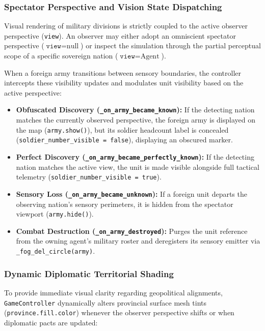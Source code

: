 \subsubsection{Spectator Perspective and Vision State Dispatching}
Visual rendering of military divisions is strictly coupled to the active observer perspective (\texttt{view}). An observer may either adopt an omniscient spectator perspective ($\texttt{view} = \text{null}$) or inspect the simulation through the partial perceptual scope of a specific sovereign nation ($\texttt{view} = \text{Agent}$).

When a foreign army transitions between sensory boundaries, the controller intercepts these visibility updates and modulates unit visibility based on the active perspective:
\begin{itemize}
    \item \textbf{Obfuscated Discovery (\texttt{\_on\_army\_became\_known}):} If the detecting nation matches the currently observed perspective, the foreign army is displayed on the map (\texttt{army.show()}), but its soldier headcount label is concealed (\texttt{soldier\_number\_visible = false}), displaying an obscured marker.
    \item \textbf{Perfect Discovery (\texttt{\_on\_army\_became\_perfectly\_known}):} If the detecting nation matches the active view, the unit is made visible alongside full tactical telemetry (\texttt{soldier\_number\_visible = true}).
    \item \textbf{Sensory Loss (\texttt{\_on\_army\_became\_unknown}):} If a foreign unit departs the observing nation's sensory perimeters, it is hidden from the spectator viewport (\texttt{army.hide()}).
    \item \textbf{Combat Destruction (\texttt{\_on\_army\_destroyed}):} Purges the unit reference from the owning agent's military roster and deregisters its sensory emitter via \texttt{\_fog\_del\_circle(army)}.
\end{itemize}

\subsubsection{Dynamic Diplomatic Territorial Shading}
To provide immediate visual clarity regarding geopolitical alignments, \texttt{GameController} dynamically alters provincial surface mesh tints (\texttt{province.fill.color}) whenever the observer perspective shifts or when diplomatic pacts are updated:

